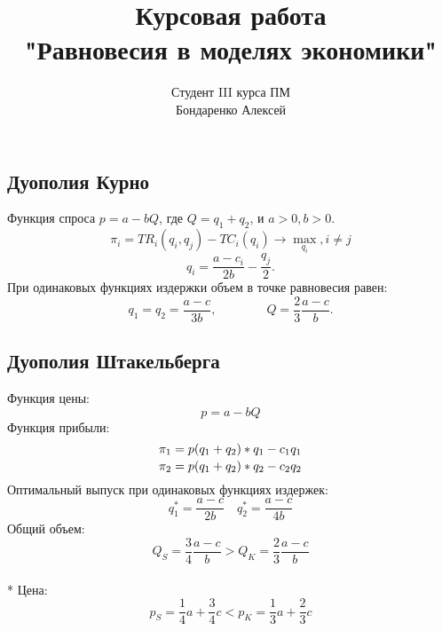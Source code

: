 \documentclass {beamer}
\title{Курсовая работа\\ "Равновесия в моделях экономики"}
\author {Студент III курса ПМ \\ Бондаренко Алексей}
\date{}
\begin{document}
\begin{frame}
\maketitle
\end{frame}

\begin{frame}
\section{Дуополия Курно}
Функция спроса $p=a-bQ$, где $Q=q_1+q_2$, и $a>0,b>0.$ $$\pi_i=TR_i(q_i,q_j)-TC_i(q_i)\to \max_{q_i} ,i\ne j$$
\begin{equation} \label{qi}  q_i = \frac{a-c_i}{2b}-\frac {q_j}{2}.  \end{equation}
При одинаковых функциях издержки объем в точке равновесия равен: $$q_1 =q_2 = \frac {a-c}{3b}, \qquad\qquad Q=\frac{2}{3}\frac{a-c}{b}.$$
\end{frame}

\begin{frame}
\section{Дуополия Штакельберга}
Функция цены: $$p=a-bQ$$ Функция прибыли: $${\pi_1 = p(q_1+q_2)*q_1-c_1 q_1 \atop \pi_2 = p(q_1+q_2)*q_2-c_2 q_2 }$$ Оптимальный выпуск при одинаковых функциях издержек:$$q^*_1=\frac{a-c}{2b} \quad q^*_2=\frac{a-c}{4b}$$ Общий объем: $$Q_S=\frac{3}{4}\frac{a-c}{b}>Q_K=\frac{2}{3}\frac{a-c}{b} $$\\* Цена:$$ p_S=\frac{1}{4}a+\frac{3}{4}c<p_K=\frac{1}{3}a+\frac{2}{3}c$$
\end{frame}
\end{document}
